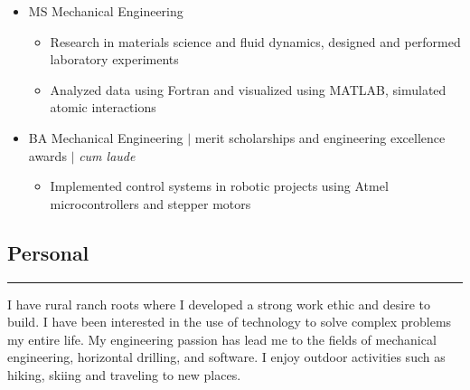 \documentclass[10pt]{article}
\newenvironment{roles}
{ \vspace{0.25em}
  \begin{itemize}
    \setlength{\itemsep}{-0.75em}
    \setlength{\parskip}{0em}
    \setlength{\parsep}{-0.5em}
    \setlength{\partopsep}{0pt}
    \setlength{\topsep}{0pt}
}
{ \end{itemize}
  \vspace{0.5em}
}
\newcommand*\minitem{
  \vspace{-0.25em}
  \item[$\cdot$]
  \vspace{-0.25em}
}
\newcommand*\nvssec{
  \vspace{-1.5em}
  \subsection*
}
\newenvironment{majitem}
{
  \vspace{-0.5em}
  \item[]
}
{
  \vspace{0.5em}
}
\begin{document}
\begin{roles}
  \begin{majitem}
    MS Mechanical Engineering
  \end{majitem}
  \begin{roles}
    \minitem Research in materials science and fluid dynamics, designed and performed laboratory experiments \\
    \minitem Analyzed data using Fortran and visualized using MATLAB, simulated atomic interactions\\
  \end{roles}

  \begin{majitem}
    BA Mechanical Engineering $\vert$ merit scholarships and engineering excellence awards $\vert$ \emph{cum laude}
  \end{majitem}
  \begin{roles}
    \minitem Implemented control systems in robotic projects using Atmel microcontrollers and stepper motors  \
  \end{roles}
\end{roles}
\nvssec{Personal}
\vspace{-1.5em}
\noindent\rule{\textwidth}{0.5pt}
\indent I have rural ranch roots where I developed a strong work ethic and desire to build.  I have been interested in the use of technology to solve complex problems my entire life.  My engineering passion has lead me to the fields of mechanical engineering, horizontal drilling, and software.  I enjoy outdoor activities such as hiking, skiing and traveling to new places.
\end{document}

